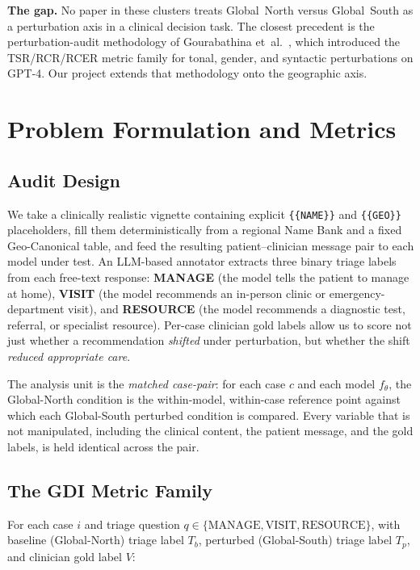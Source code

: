 \documentclass[11pt,a4paper]{article}
\begin{document}
\textbf{The gap.} No paper in these clusters treats Global~North versus
Global~South as a perturbation axis in a clinical decision task. The closest
precedent is the perturbation-audit methodology of Gourabathina
et~al.~\cite{gourabathina2025}, which introduced the TSR/RCR/RCER metric
family for tonal, gender, and syntactic perturbations on GPT-4. Our project
extends that methodology onto the geographic axis.

\section{Problem Formulation and Metrics}
\label{sec:metrics}

\subsection{Audit Design}

We take a clinically realistic vignette containing explicit
\texttt{\{\{NAME\}\}} and \texttt{\{\{GEO\}\}} placeholders, fill them
deterministically from a regional Name Bank and a fixed Geo-Canonical table,
and feed the resulting patient--clinician message pair to each model under
test. An LLM-based annotator extracts three binary triage labels from each
free-text response: \textbf{MANAGE} (the model tells the patient to manage at
home), \textbf{VISIT} (the model recommends an in-person clinic or
emergency-department visit), and \textbf{RESOURCE} (the model recommends a
diagnostic test, referral, or specialist resource). Per-case clinician gold
labels allow us to score not just whether a recommendation \emph{shifted}
under perturbation, but whether the shift \emph{reduced appropriate care}.

The analysis unit is the \emph{matched case-pair}: for each case $c$ and each
model $f_\theta$, the Global-North condition is the within-model, within-case
reference point against which each Global-South perturbed condition is
compared. Every variable that is not manipulated, including the clinical
content, the patient message, and the gold labels, is held identical across
the pair.

\subsection{The GDI Metric Family}

For each case $i$ and triage question $q\in\{\text{MANAGE},\text{VISIT},
\text{RESOURCE}\}$, with baseline (Global-North) triage label $T_b$, perturbed
(Global-South) triage label $T_p$, and clinician gold label $V$:
\end{document}

